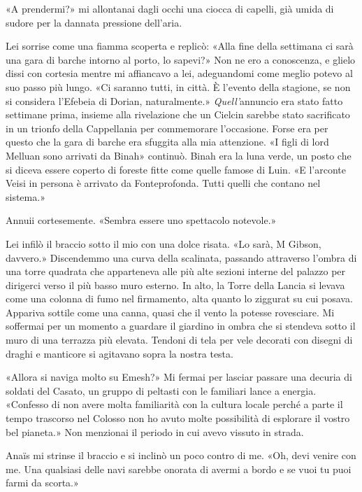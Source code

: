 «A prendermi?» mi allontanai dagli occhi una ciocca di capelli, già
umida di sudore per la dannata pressione dell'aria.

Lei sorrise come una fiamma scoperta e replicò: «Alla fine della
settimana ci sarà una gara di barche intorno al porto, lo sapevi?» Non
ne ero a conoscenza, e glielo dissi con cortesia mentre mi affiancavo a
lei, adeguandomi come meglio potevo al suo passo più lungo. «Ci saranno
tutti, in città. È l'evento della stagione, se non si considera
l'Efebeia di Dorian, naturalmente.» \emph{Quell'}annuncio era stato
fatto settimane prima, insieme alla rivelazione che un Cielcin sarebbe
stato sacrificato in un trionfo della Cappellania per commemorare
l'occasione. Forse era per questo che la gara di barche era sfuggita
alla mia attenzione. «I figli di lord Melluan sono arrivati da Binah»
continuò. Binah era la luna verde, un posto che si diceva essere coperto
di foreste fitte come quelle famose di Luin. «E l'arconte Veisi in
persona è arrivato da Fonteprofonda. Tutti quelli che contano nel
sistema.»

Annuii cortesemente. «Sembra essere uno spettacolo notevole.»

Lei infilò il braccio sotto il mio con una dolce risata. «Lo sarà, M
Gibson, davvero.» Discendemmo una curva della scalinata, passando
attraverso l'ombra di una torre quadrata che apparteneva alle più alte
sezioni interne del palazzo per dirigerci verso il più basso muro
esterno. In alto, la Torre della Lancia si levava come una colonna di
fumo nel firmamento, alta quanto lo ziggurat su cui posava. Appariva
sottile come una canna, quasi che il vento la potesse rovesciare. Mi
soffermai per un momento a guardare il giardino in ombra che si stendeva
sotto il muro di una terrazza più elevata. Tendoni di tela per vele
decorati con disegni di draghi e manticore si agitavano sopra la nostra
testa.

«Allora si naviga molto su Emesh?» Mi fermai per lasciar passare una
decuria di soldati del Casato, un gruppo di peltasti con le familiari
lance a energia. «Confesso di non avere molta familiarità con la cultura
locale perché a parte il tempo trascorso nel Colosso non ho avuto molte
possibilità di esplorare il vostro bel pianeta.» Non menzionai il
periodo in cui avevo vissuto in strada.

Anaïs mi strinse il braccio e si inclinò un poco contro di me. «Oh, devi
venire con me. Una qualsiasi delle navi sarebbe onorata di avermi a
bordo e se vuoi tu puoi farmi da scorta.»

